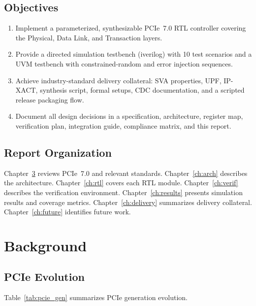 \documentclass[12pt,a4paper]{report}
\begin{document}
\section{Objectives}

\begin{enumerate}[noitemsep]
  \item Implement a parameterized, synthesizable PCIe~7.0 RTL controller
        covering the Physical, Data Link, and Transaction layers.
  \item Provide a directed simulation testbench (iverilog) with 10 test scenarios
        and a UVM testbench with constrained-random and error injection sequences.
  \item Achieve industry-standard delivery collateral: SVA properties, UPF,
        IP-XACT, synthesis script, formal setups, CDC documentation, and
        a scripted release packaging flow.
  \item Document all design decisions in a specification, architecture, register map,
        verification plan, integration guide, compliance matrix, and this report.
\end{enumerate}

\section{Report Organization}

Chapter~\ref{ch:background} reviews PCIe~7.0 and relevant standards.
Chapter~\ref{ch:arch} describes the architecture. Chapter~\ref{ch:rtl} covers
each RTL module. Chapter~\ref{ch:verif} describes the verification environment.
Chapter~\ref{ch:results} presents simulation results and coverage metrics.
Chapter~\ref{ch:delivery} summarizes delivery collateral.
Chapter~\ref{ch:future} identifies future work.

\chapter{Background}\label{ch:background}

\section{PCIe Evolution}

Table~\ref{tab:pcie_gen} summarizes PCIe generation evolution.
\end{document}
